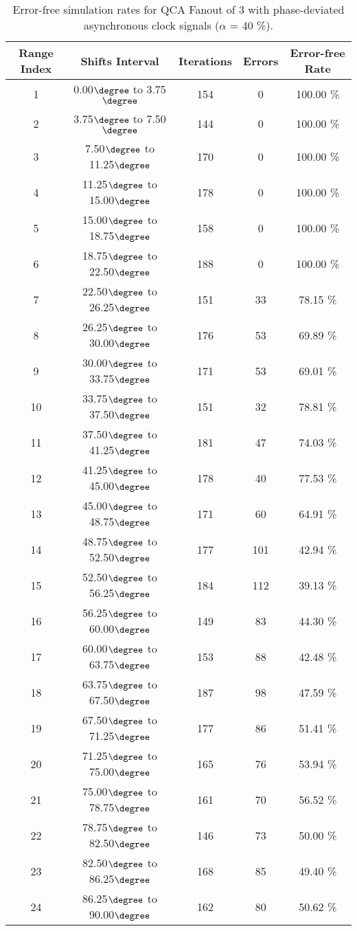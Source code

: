 \flushleft
\begin{table}[h]
\begin{center}
\caption{Error-free simulation rates for QCA Fanout of 3 with phase-deviated asynchronous clock signals ($\alpha$ = 40 \%).}
\begin{tabular}{|c|c|c|c|c|}
\hline
\textbf{Range Index} & \textbf{Shifts Interval} & \textbf{Iterations} & \textbf{Errors} & \textbf{Error-free Rate} \\
\hline
1  &  0.00$\degree$ to  3.75$\degree$ & 154 &  0 & 100.00 \% \\
\hline
2  &  3.75$\degree$ to  7.50$\degree$ & 144 &  0 & 100.00 \% \\
\hline
3  &  7.50$\degree$ to 11.25$\degree$ & 170 &  0 & 100.00 \% \\
\hline
4  & 11.25$\degree$ to 15.00$\degree$ & 178 &  0 & 100.00 \% \\
\hline
5  & 15.00$\degree$ to 18.75$\degree$ & 158 &  0 & 100.00 \% \\
\hline
6  & 18.75$\degree$ to 22.50$\degree$ & 188 &  0 & 100.00 \% \\
\hline
7  & 22.50$\degree$ to 26.25$\degree$ & 151 & 33 & 78.15 \% \\
\hline
8  & 26.25$\degree$ to 30.00$\degree$ & 176 & 53 & 69.89 \% \\
\hline
9  & 30.00$\degree$ to 33.75$\degree$ & 171 & 53 & 69.01 \% \\
\hline
10 & 33.75$\degree$ to 37.50$\degree$ & 151 & 32 & 78.81 \% \\
\hline
11 & 37.50$\degree$ to 41.25$\degree$ & 181 & 47 & 74.03 \% \\
\hline
12 & 41.25$\degree$ to 45.00$\degree$ & 178 & 40 & 77.53 \% \\
\hline
13 & 45.00$\degree$ to 48.75$\degree$ & 171 & 60 & 64.91 \% \\
\hline
14 & 48.75$\degree$ to 52.50$\degree$ & 177 & 101 & 42.94 \% \\
\hline
15 & 52.50$\degree$ to 56.25$\degree$ & 184 & 112 & 39.13 \% \\
\hline
16 & 56.25$\degree$ to 60.00$\degree$ & 149 & 83 & 44.30 \% \\
\hline
17 & 60.00$\degree$ to 63.75$\degree$ & 153 & 88 & 42.48 \% \\
\hline
18 & 63.75$\degree$ to 67.50$\degree$ & 187 & 98 & 47.59 \% \\
\hline
19 & 67.50$\degree$ to 71.25$\degree$ & 177 & 86 & 51.41 \% \\
\hline
20 & 71.25$\degree$ to 75.00$\degree$ & 165 & 76 & 53.94 \% \\
\hline
21 & 75.00$\degree$ to 78.75$\degree$ & 161 & 70 & 56.52 \% \\
\hline
22 & 78.75$\degree$ to 82.50$\degree$ & 146 & 73 & 50.00 \% \\
\hline
23 & 82.50$\degree$ to 86.25$\degree$ & 168 & 85 & 49.40 \% \\
\hline
24 & 86.25$\degree$ to 90.00$\degree$ & 162 & 80 & 50.62 \% \\
\hline


\end{tabular}
\end{center}
\end{table}

